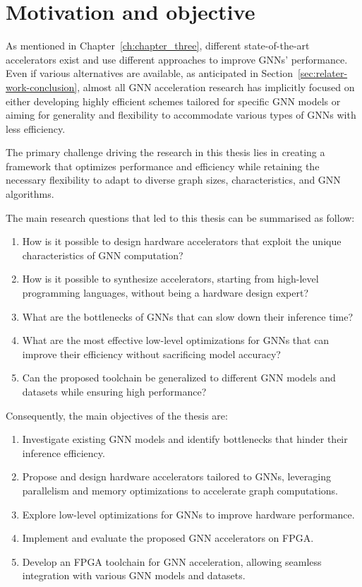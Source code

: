 \section{Motivation and objective}
\label{sec:motivation}%

As mentioned in Chapter~\ref{ch:chapter_three}, different state-of-the-art accelerators exist and use different approaches to improve GNNs' performance.
Even if various alternatives are available, as anticipated in Section~\ref{sec:relater-work-conclusion}, almost all GNN acceleration research has implicitly focused on either developing highly efficient schemes tailored for specific GNN models or aiming for generality and flexibility to accommodate various types of GNNs with less efficiency.

The primary challenge driving the research in this thesis lies in creating a framework that optimizes performance and efficiency while retaining the necessary flexibility to adapt to diverse graph sizes, characteristics, and GNN algorithms.

The main research questions that led to this thesis can be summarised as follow:
\begin{enumerate}
    \item How is it possible to design hardware accelerators that exploit the unique characteristics of GNN computation?
    \item How is it possible to synthesize accelerators, starting from high-level programming languages, without being a hardware design expert?
    \item What are the bottlenecks of GNNs that can slow down their inference time?
    \item What are the most effective low-level optimizations for GNNs that can improve their efficiency without sacrificing model accuracy?
    \item Can the proposed toolchain be generalized to different GNN models and datasets while ensuring high performance?
\end{enumerate}


Consequently, the main objectives of the thesis are:
\begin{enumerate}
    \item Investigate existing GNN models and identify bottlenecks that hinder their inference efficiency.
    \item Propose and design hardware accelerators tailored to GNNs, leveraging parallelism and memory optimizations to accelerate graph computations.
    \item Explore low-level optimizations for GNNs to improve hardware performance.
    \item Implement and evaluate the proposed GNN accelerators on FPGA.
    \item Develop an FPGA toolchain for GNN acceleration, allowing seamless integration with various GNN models and datasets.
\end{enumerate}


